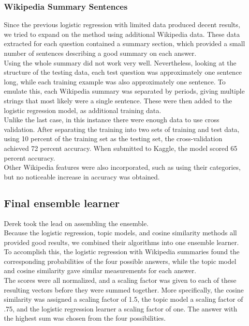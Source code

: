 \documentclass{article}
\theoremstyle{mystuff}
\theoremstyle{myexample}
\theoremstyle{named}
\begin{document}
\subsubsection{Wikipedia Summary Sentences}
Since the previous logistic regression with limited data produced decent results, we tried to expand on the method using additional Wikipedia data.  These data extracted for each question contained a summary section, which provided a small number of sentences describing a good summary on each answer.\\

Using the whole summary did not work very well.  Nevertheless, looking at the structure of the testing data, each test question was approximately one sentence long, while each training example was also approximately one sentence.  To emulate this, each Wikipedia summary was separated by periods, giving multiple strings that most likely were a single sentence.  These were then added to the logistic regression model, as additional training data.\\

Unlike the last case, in this instance there were enough data to use cross validation.  After separating the training into two sets of training and test data, using 10 percent of the training set as the testing set, the cross-validation achieved 72 percent accuracy.  When submitted to Kaggle, the model scored 65 percent accuracy.\\

Other Wikipedia features were also incorporated, such as using their categories, but no noticeable increase in accuracy was obtained.\\
\label{ssec:log_reg}

\subsection{Final ensemble learner}
Derek took the lead on assembling the ensemble.\\

Because the logistic regression, topic models, and cosine similarity methods all provided good results, we combined their algorithms into one ensemble learner.  To accomplish this, the logistic regression with Wikipedia summaries found the corresponding probabilities of the four possible answers, while the topic model and cosine similarity gave similar measurements for each answer. \\

The scores were all normalized, and a scaling factor was given to each of these resulting vectors before they were summed together. More specifically, the cosine similarity was assigned a scaling factor of 1.5, the topic model a scaling factor of .75, and the logistic regression learner a scaling factor of one.  The answer with the highest sum was chosen from the four possibilities. \\
\end{document}
